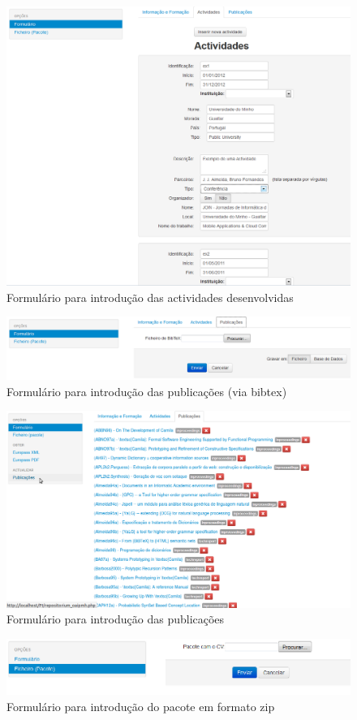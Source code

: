 \documentclass[a4paper,11pt,openright,openbib]{article}
\begin{document}
\begin{figure}[!ht]
\centering
\includegraphics[scale=0.6]{iActivities.png}
\caption{Formulário para introdução das actividades desenvolvidas}
\label{fig:iActivities}
\end{figure}
\begin{figure}[!ht]
\centering
\includegraphics[scale=0.6]{iPublications.png}
\caption{Formulário para introdução das publicações (via bibtex)}
\label{fig:iPublications}
\end{figure}
\begin{figure}[!ht]
\centering
\includegraphics[scale=0.6]{iPublications2.png}
\caption{Formulário para introdução das publicações}
\label{fig:iPublications2}
\end{figure}
\begin{figure}[!ht]
\centering
\includegraphics[scale=0.6]{bypacote.png}
\caption{Formulário para introdução do pacote em formato zip}
\label{fig:bypacote}
\end{figure}
\end{document}
